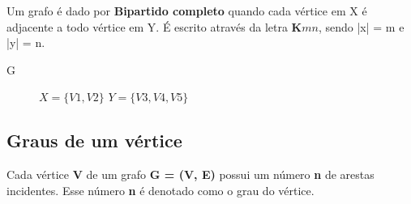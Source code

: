 \documentclass[a4paper, 12pt]{article}
\begin{document}
Um grafo é dado por \textbf{Bipartido completo} quando cada vértice em X é adjacente a todo vértice em Y. É escrito através da letra $\textbf{K}{mn}$, sendo |x| = m e |y| = n.

\pagebreak

\begin{center}
	G\:
	\begin{figure}[hbt!]
		\centering

	\caption{$X = \{V1, V2\}$ $Y = \{V3, V4, V5\}$}
\end{figure}
\end{center}


\subsection{Graus de um vértice}

    Cada vértice \textbf{V} de um grafo \textbf{G = (V, E)} possui um número \textbf{n} de arestas incidentes. Esse número \textbf{n} é denotado como o grau do vértice.
    
\end{document}
